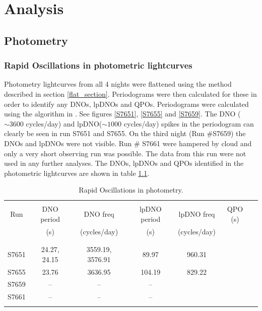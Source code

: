\chapter{Analysis}

\section{Photometry}
\label{analysis_phot}

\subsection{Rapid Oscillations in photometric lightcurves}
\label{ro_phot_lc}
Photometry lightcurves from all 4 nights were flattened using the method described in section \ref{flat_section}. Periodograms were then calculated for these in order to identify any DNOs, lpDNOs and QPOs. Periodograms were calculated using the algorithm in \cite{kurtz_ft}. See figures \ref{S7651}, \ref{S7655} and \ref{S7659}. The DNO ($\sim3600$ cycles/day) and lpDNO($\sim1000$ cycles/day) spikes in the periodogram can clearly be seen in run S7651 and S7655. On the third night (Run \#S7659) the DNOs and lpDNOs were not visible. Run \# S7661 were hampered by cloud and only a very short observing run was possible. The data from this run were not used in any further analyses. The DNOs, lpDNOs and QPOs identified in the photometric lightcurves are shown in table \ref{RO_table}.

\begin{table}
\begin{scriptsize}
 
\centering
\begin{tabular}{ccccccc}
\hline \hline\\
Run    & DNO period & DNO freq      & lpDNO period & lpDNO freq     & QPO (s)\\ 
       & (s)        &  (cycles/day) &  (s)         &  (cycles/day)  &        \\ 
\\\hline \\
S7651  & 24.27, 24.15 & 3559.19, 3576.91 &  89.97 &  960.31  &  \\ 
S7655  & 23.76 & 3636.95 & 104.19 & 829.22 & \\ 
S7659  & --& --& -- &&\\ 
S7661  & -- & -- & -- &&\\\\
\hline
\end{tabular}

\caption[Rapid Oscillations in photometry]{Rapid Oscillations in photometry.}
\label{RO_table}
\end{scriptsize}
\end{table}



